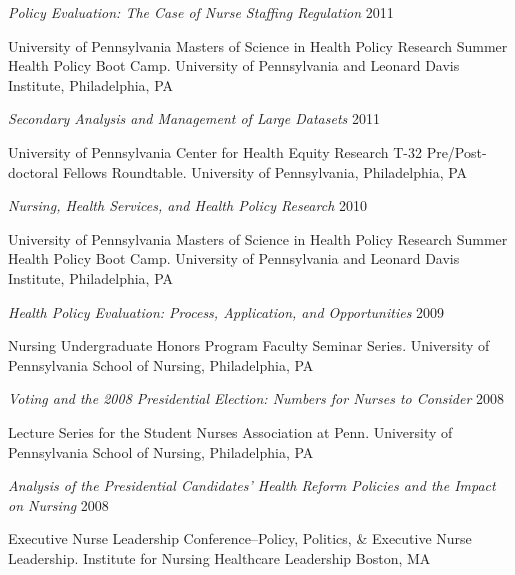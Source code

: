 \documentclass[10pt,]{article}
\begin{document}
{{{{{{{{{{{{{{{\begin{hangparas}{.5in}{1}
{\textit {Policy Evaluation: The Case of Nurse Staffing Regulation}} \hfill 2011 
\vspace{-2.5mm}
\begin{adjustwidth}{0.5cm}{1cm}
University of Pennsylvania Masters of Science in Health Policy Research Summer Health Policy Boot Camp. University of Pennsylvania and Leonard Davis Institute, Philadelphia, PA
\end{adjustwidth}

{\textit {Secondary Analysis and Management of Large Datasets}} \hfill 2011 
\vspace{-2.5mm}
\begin{adjustwidth}{0.5cm}{1cm}
University of Pennsylvania Center for Health Equity Research T-32 Pre/Post-doctoral Fellows Roundtable. University of Pennsylvania, Philadelphia, PA
\end{adjustwidth}

{\textit {Nursing, Health Services, and Health Policy Research}} \hfill 2010 
\vspace{-2.5mm}
\begin{adjustwidth}{0.5cm}{1cm}
University of Pennsylvania Masters of Science in Health Policy Research Summer Health Policy Boot Camp. University of Pennsylvania and Leonard Davis Institute, Philadelphia, PA
\end{adjustwidth}

{\textit {Health Policy Evaluation: Process, Application, and Opportunities}} \hfill 2009 
\vspace{-2.5mm}
\begin{adjustwidth}{0.5cm}{1cm}
Nursing Undergraduate Honors Program Faculty Seminar Series. University of Pennsylvania School of Nursing, Philadelphia, PA
\end{adjustwidth}

{\textit {Voting and the 2008 Presidential Election: Numbers for Nurses to Consider}} \hfill 2008 
\vspace{-2.5mm}
\begin{adjustwidth}{0.5cm}{1cm}
Lecture Series for the Student Nurses Association at Penn. University of Pennsylvania School of Nursing, Philadelphia, PA
\end{adjustwidth}

{\textit {Analysis of the Presidential Candidates’ Health Reform Policies and the Impact on Nursing}} \hfill 2008 
\vspace{-2.5mm}
\begin{adjustwidth}{0.5cm}{1cm}
Executive Nurse Leadership Conference–Policy, Politics, \& Executive Nurse Leadership. Institute for Nursing Healthcare Leadership Boston, MA
\end{adjustwidth}


\end{hangparas}}}}}}}}}}}}}}}}
\end{document}
